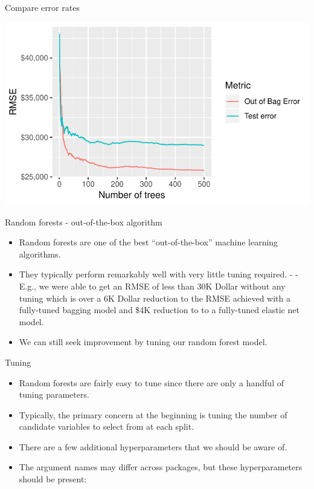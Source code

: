\documentclass[10pt,ignorenonframetext,]{beamer}
\providecommand{\tightlist}{%
  \setlength{\itemsep}{0pt}\setlength{\parskip}{0pt}}
\begin{document}
\begin{frame}{Compare error rates}

\includegraphics{c2_random_forests_files/figure-beamer/unnamed-chunk-10-1.pdf}

\end{frame}

\begin{frame}{Random forests - out-of-the-box algorithm}

\begin{itemize}
\tightlist
\item
  Random forests are one of the best ``out-of-the-box'' machine learning
  algorithms.
\item
  They typically perform remarkably well with very little tuning
  required. - - E.g., we were able to get an RMSE of less than 30K
  Dollar without any tuning which is over a 6K Dollar reduction to the
  RMSE achieved with a fully-tuned bagging model and \$4K reduction to
  to a fully-tuned elastic net model.
\item
  We can still seek improvement by tuning our random forest model.
\end{itemize}

\end{frame}

\begin{frame}{Tuning}

\begin{itemize}
\tightlist
\item
  Random forests are fairly easy to tune since there are only a handful
  of tuning parameters.
\item
  Typically, the primary concern at the beginning is tuning the number
  of candidate variables to select from at each split.
\item
  There are a few additional hyperparameters that we should be aware of.
\item
  The argument names may differ across packages, but these
  hyperparameters should be present:
\end{itemize}

\end{frame}
\end{document}
